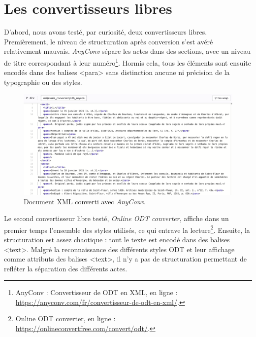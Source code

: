 \section{Les convertisseurs libres}
\label{II.4.1}

\par D'abord, nous avons testé, par curiosité, deux convertisseurs libres. Premièrement, le niveau de structuration après conversion s’est avéré relativement mauvais. \textit{AnyConv} sépare les actes dans des sections, avec un niveau de titre correspondant à leur numéro\footnote{AnyConv : Convertisseur de ODT en XML, en ligne : \url{https://anyconv.com/fr/convertisseur-de-odt-en-xml/}.}. Hormis cela, tous les éléments sont ensuite encodés dans des balises <para> sans distinction aucune ni précision de la typographie ou des styles. 

\begin{figure}[ht!]
    \centering
    \includegraphics[scale=0.4]{front/images/any_conv.png}
    \caption{Document XML converti avec \textit{AnyConv}.}
    \label{fig:any_conv}
\end{figure}

\par Le second convertisseur libre testé, \textit{Online ODT converter}, affiche dans un premier temps l’ensemble des styles utilisés, ce qui entrave la lecture\footnote{Online ODT converter, en ligne : \url{https://onlineconvertfree.com/convert/odt/}.}. Ensuite, la structuration est assez chaotique : tout le texte est encodé dans des balises <text>. Malgré la reconnaissance des différents styles ODT et leur affichage comme attributs des balises <text>, il n’y a pas de structuration permettant de refléter la séparation des différents actes. 


